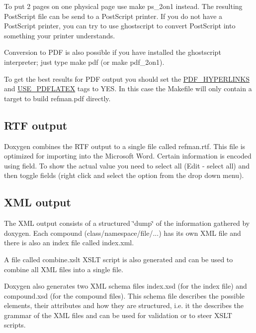 To put 2 pages on one physical page use {\ttfamily make ps\_\-2on1} instead. The resulting PostScript file can be send to a PostScript printer. If you do not have a PostScript printer, you can try to use ghostscript to convert PostScript into something your printer understands.

Conversion to PDF is also possible if you have installed the ghostscript interpreter; just type {\ttfamily make pdf} (or {\ttfamily make pdf\_\-2on1}).

To get the best results for PDF output you should set the \hyperlink{config_cfg_pdf_hyperlinks}{PDF\_\-HYPERLINKS} and \hyperlink{config_cfg_use_pdflatex}{USE\_\-PDFLATEX} tags to {\ttfamily YES}. In this case the {\ttfamily Makefile} will only contain a target to build {\ttfamily refman.pdf} directly.\hypertarget{starting_rtf_out}{}\subsection{RTF output}\label{starting_rtf_out}
 Doxygen combines the RTF output to a single file called refman.rtf. This file is optimized for importing into the Microsoft Word. Certain information is encoded using field. To show the actual value you need to select all (Edit -\/ select all) and then toggle fields (right click and select the option from the drop down menu).\hypertarget{starting_xml_out}{}\subsection{XML output}\label{starting_xml_out}
 The XML output consists of a structured \char`\"{}dump\char`\"{} of the information gathered by doxygen. Each compound (class/namespace/file/...) has its own XML file and there is also an index file called index.xml.

A file called combine.xslt XSLT script is also generated and can be used to combine all XML files into a single file.

Doxygen also generates two XML schema files index.xsd (for the index file) and compound.xsd (for the compound files). This schema file describes the possible elements, their attributes and how they are structured, i.e. it the describes the grammar of the XML files and can be used for validation or to steer XSLT scripts.

